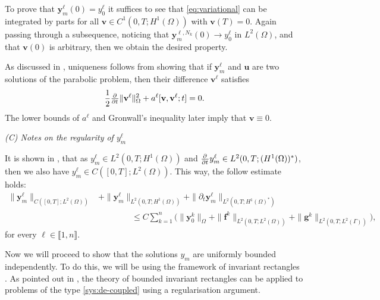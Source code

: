 \documentclass[11pt]{article}
\newcommand{\llb}{\llbracket}
\newcommand{\rrb}{\rrbracket}
\newcommand{\by}{\mathbf{y}}
\newcommand{\bv}{\mathbf{v}}
\begin{document}
	To prove that \( \by_m^\ell (0) = y_0^\ell\) it suffices to see that \eqref{eq:variational} can be integrated by parts for all \( \bv \in C^1(0,T;H^1(\Omega))\) with \(\bv(T) = 0\). Again passing through a subsequence, noticing that \( \by_m^{\ell, N_k} (0) \to y_0^\ell\) in \(L^2(\Omega)\), and that \(\bv(0)\) is arbitrary, then we obtain the desired property.
	
	As discussed in \cite{Evans-2010}, uniqueness follows from showing that if \( \by_m^\ell\) and \( \mathbf{u}\) are two solutions of the parabolic problem, then their difference \(\bv^\ell\) satisfies
	\[
		\frac{1}{2}
		\pd{ }{t} \| \bv^\ell \|^2_{\Omega} + 
		a^\ell [\bv, \bv^\ell; t]
		=
		0.
	\]
	The lower bounds of \(a^\ell\) and Gronwall's inequality later imply that \( \bv \equiv 0\).
















\vspace{1\baselineskip}
\noindent\emph{(C) Notes on the regularity of \(y_m^\ell\)}
\vspace{0.5\baselineskip}


It is shown in \cite{Evans-2010}, that as \(y_m^\ell \in L^2(0,T; H^1(\Omega)) \) and \(\pd{ }{t} y_m^\ell \in L^2(0,T; (H^1(\Omega))^*) \), then we also have  \(y_m^\ell \in C([0,T]; L^2 (\Omega))\). This way, the follow estimate holds:
	\begin{equation}
	\begin{aligned}
		\| \by_m^{\ell} \|_{C([0,T];L^2(\Omega) )} 
		&+ \|\by_m^{\ell} \|_{L^2(0,T; H^1(\Omega))}
		+  \| \partial_t \by_m^{\ell} \|_{L^2(0,T;H^1(\Omega)^*)}
		\\
		&\qquad\qquad\leq 
		C\sum_{k=1}^n \bigg(  \| \by_0^k \|_\Omega + \|\mathbf{f}^k\|_{L^2(0,T;L^2(\Omega))} + \|\mathbf{g}^k\|_{L^2(0,T; L^2(\Gamma))} \bigg),
	\end{aligned}
	\end{equation}
	for every \( \ell \in \llb 1, n\rrb\).



Now we will proceed to show that the solutions \(y_m\) are uniformly bounded independently.  To do this, we will be using the framework of invariant rectangles \cite{Redlinger-1989,Weinberger-1975}. As pointed out in \cite{Ptashnyk-2016}, the theory of bounded invariant rectangles can be applied to problems of the type \eqref{sys:de-coupled} using a regularisation argument. 
\end{document}
